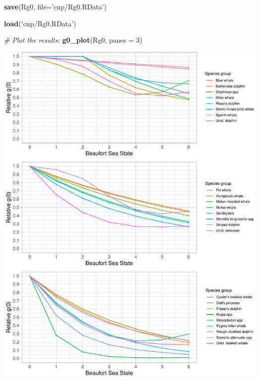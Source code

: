 \documentclass[
]{book}
\newenvironment{Shaded}{\begin{snugshade}}{\end{snugshade}}
\newcommand{\CommentTok}[1]{\textcolor[rgb]{0.56,0.35,0.01}{\textit{#1}}}
\newcommand{\DataTypeTok}[1]{\textcolor[rgb]{0.13,0.29,0.53}{#1}}
\newcommand{\DecValTok}[1]{\textcolor[rgb]{0.00,0.00,0.81}{#1}}
\newcommand{\KeywordTok}[1]{\textcolor[rgb]{0.13,0.29,0.53}{\textbf{#1}}}
\newcommand{\NormalTok}[1]{#1}
\newcommand{\StringTok}[1]{\textcolor[rgb]{0.31,0.60,0.02}{#1}}
\begin{document}
\begin{Shaded}
\begin{Highlighting}[]
\KeywordTok{save}\NormalTok{(Rg0, }\DataTypeTok{file=}\StringTok{'cnp/Rg0.RData'}\NormalTok{)}
\end{Highlighting}
\end{Shaded}

\begin{Shaded}
\begin{Highlighting}[]
\KeywordTok{load}\NormalTok{(}\StringTok{'cnp/Rg0.RData'}\NormalTok{)}
\end{Highlighting}
\end{Shaded}

\begin{Shaded}
\begin{Highlighting}[]
\CommentTok{# Plot the results: }
\KeywordTok{g0_plot}\NormalTok{(Rg0, }\DataTypeTok{panes =} \DecValTok{3}\NormalTok{)}
\end{Highlighting}
\end{Shaded}

\includegraphics{figures/unnamed-chunk-329-1.pdf}
\end{document}

